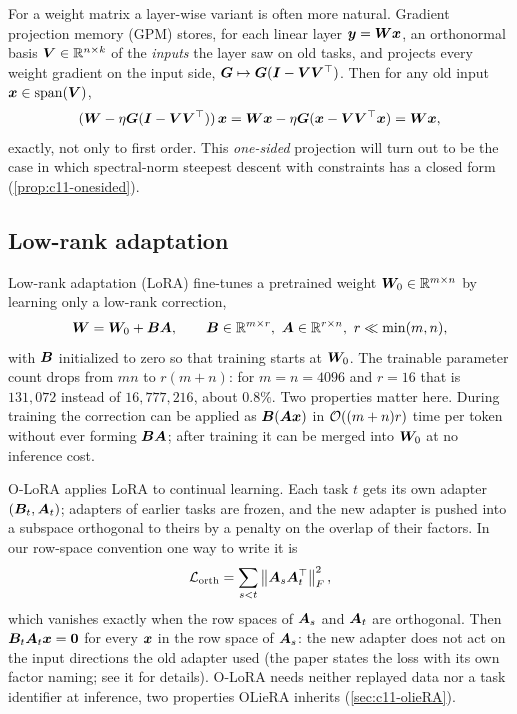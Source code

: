 For a weight matrix a layer-wise variant is often more natural. Gradient projection memory (GPM)
\citep{c11-saha2021gpm} stores, for each linear layer $\bm{y} = \bm{W}\bm{x}$, an orthonormal basis
$\bm{V} \in \mathbb{R}^{n\times k}$ of the \emph{inputs} the layer saw on old tasks, and projects every
weight gradient on the input side, $\bm{G} \mapsto \bm{G}(\bm{I} - \bm{V}\bm{V}^{\top})$. Then for any old input
$\bm{x} \in \operatorname{span}(\bm{V})$,
\begin{equation}
  (\bm{W} - \eta\bm{G}(\bm{I} - \bm{V}\bm{V}^{\top}))\,\bm{x} = \bm{W}\bm{x} - \eta\bm{G}(\bm{x} - \bm{V}\bm{V}^{\top}\bm{x}) = \bm{W}\bm{x} ,
  \label{eq:c11-gpm}
\end{equation}
exactly, not only to first order. This \emph{one-sided} projection will turn out to be the case in
which spectral-norm steepest descent with constraints has a closed form
(\cref{prop:c11-onesided}).

\subsection{Low-rank adaptation}\label{sec:c11-lora}

Low-rank adaptation (LoRA) \citep{c11-hu2022lora} fine-tunes a pretrained weight
$\bm{W}_0 \in \mathbb{R}^{m\times n}$ by learning only a low-rank correction,
\begin{equation}
  \bm{W} = \bm{W}_0 + \bm{B}\bm{A}, \qquad \bm{B} \in \mathbb{R}^{m\times r},\ \bm{A} \in \mathbb{R}^{r\times n},\ r \ll \min(m,n),
  \label{eq:c11-lora}
\end{equation}
with $\bm{B}$ initialized to zero so that training starts at $\bm{W}_0$. The trainable parameter count
drops from $mn$ to $r(m+n)$: for $m = n = 4096$ and $r = 16$ that is $131{,}072$ instead of
$16{,}777{,}216$, about $0.8\%$. Two properties matter here. During training the correction can
be applied as $\bm{B}(\bm{A}\bm{x})$ in $\mathcal{O}((m+n)r)$ time per token without ever forming $\bm{B}\bm{A}$; after
training it can be merged into $\bm{W}_0$ at no inference cost.

O-LoRA \citep{c11-wang2023olora} applies LoRA to continual learning. Each task $t$ gets its own
adapter $(\bm{B}_t, \bm{A}_t)$; adapters of earlier tasks are frozen, and the new adapter is pushed
into a subspace orthogonal to theirs by a penalty on the overlap of their factors. In our
row-space convention one way to write it is
\begin{equation}
  \mathcal{L}_{\text{orth}} = \sum_{s<t}\left\lVert \bm{A}_s\bm{A}_t^{\top}\right\rVert_F^2 ,
  \label{eq:c11-olora}
\end{equation}
which vanishes exactly when the row spaces of $\bm{A}_s$ and $\bm{A}_t$ are orthogonal. Then
$\bm{B}_t\bm{A}_t\bm{x} = \bm{0}$ for every $\bm{x}$ in the row space of $\bm{A}_s$: the new adapter does not
act on the input directions the old adapter used (the paper states the loss with its own factor
naming; see it for details). O-LoRA needs neither replayed data nor a task identifier at
inference, two properties OLieRA inherits (\cref{sec:c11-olieRA}).

